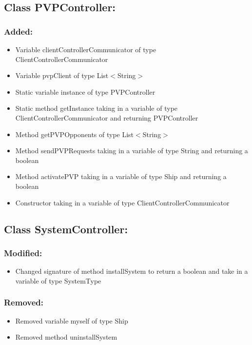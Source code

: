 \documentclass{article}
\begin{document}

\subsection{Class PVPController:}

\subsubsection{Added:}
\begin{itemize}
\item Variable clientControllerCommunicator of type ClientControllerCommunicator
\item Variable pvpClient of type List$<$String$>$
\item Static variable instance of type PVPController
\item Static method getInstance taking in a variable of type ClientControllerCommunicator and returning PVPController
\item Method getPVPOpponents of type List$<$String$>$
\item Method sendPVPRequests taking in a variable of type String and returning a boolean
\item Method activatePVP taking in a variable of type Ship and returning a boolean
\item Constructor taking in a variable of type ClientControllerCommunicator
\end{itemize}


\subsection{Class SystemController:}

\subsubsection{Modified:}
\begin{itemize}
\item Changed signature of method installSystem to return a boolean and take in a variable of type SystemType
\end{itemize}

\subsubsection{Removed:}
\begin{itemize}
\item Removed variable myself of type Ship
\item Removed method uninstallSystem
\end{itemize}
\end{document}
